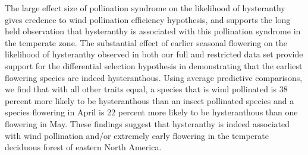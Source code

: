 \documentclass{article}
\begin{document}
\indent The large effect size of pollination syndrome on the likelihood of hysteranthy gives credence to wind pollination efficiency hypothesis, and supports the long held observation that hysteranthy is associated with this pollination syndrome in the temperate zone. The substantial effect of earlier seasonal flowering on the likelihood of hysteranthy observed in both our full and restricted data set provide support for the differential selection hypothesis in demonstrating that the earliest flowering species are indeed hysteranthous.  Using average predictive comparisons, we find that with all other traits equal, a species that is wind pollinated is 38 percent more likely to be hysteranthous than an insect pollinated species and a species flowering in April is 22 percent more likely to be hysteranthous than one flowering in May. These findings suggest that hysteranthy is indeed associated with wind pollination and/or extremely early flowering in the temperate deciduous forest of eastern North America. %
\end{document}
